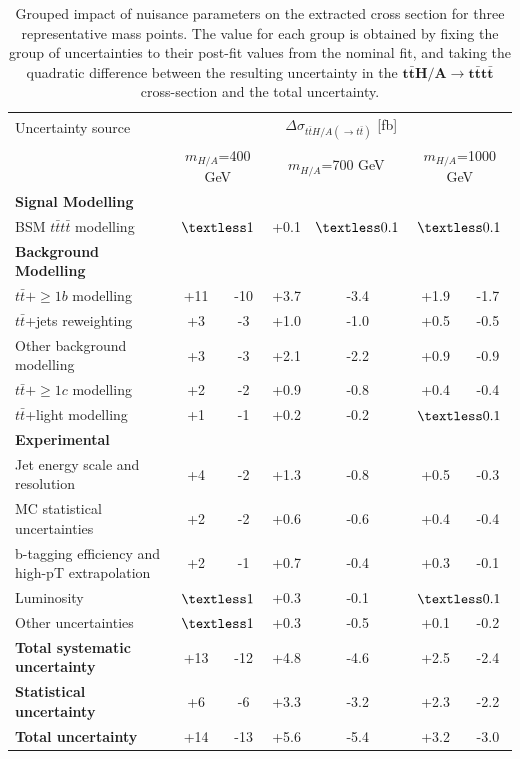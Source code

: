 \begin{table}[htbp!]
    \begin{center}
    \begin{tabular}{lcc|cc|cc}
    \hline \hline
    Uncertainty source & \multicolumn{6}{c}{$\Delta\sigma_{t\bar{t}H/A(\rightarrow t\bar{t})}$ [fb]} \\
    & \multicolumn{2}{c}{$m_{H/A}$=400 GeV} & \multicolumn{2}{c}{$m_{H/A}$=700 GeV} & \multicolumn{2}{c}{$m_{H/A}$=1000 GeV} \\
    \hline
    \textbf{Signal Modelling} & & & & & & \\
    BSM $t\bar{t}t\bar{t}$ modelling & \multicolumn{2}{c}{$\textless 1$} & +0.1 & $\textless 0.1$ & \multicolumn{2}{c}{$\textless 0.1$} \\
    \hline
    \textbf{Background Modelling} & & & & & & \\
    $t\bar{t}+\geq1b$ modelling & +11 & -10 & +3.7 & -3.4 & +1.9 & -1.7 \\
    $t\bar{t}$+jets reweighting & +3 & -3 & +1.0 & -1.0 & +0.5 & -0.5 \\
    Other background modelling & +3 & -3 & +2.1 & -2.2 & +0.9 & -0.9 \\
    $t\bar{t}+\geq1c$ modelling & +2 & -2 & +0.9 & -0.8 & +0.4 & -0.4 \\
    $t\bar{t}$+light modelling & +1 & -1 & +0.2 & -0.2 & \multicolumn{2}{c}{$\textless 0.1$} \\
    \hline
    \textbf{Experimental} & & & & & & \\
    Jet energy scale and resolution & +4 & -2 & +1.3 & -0.8 & +0.5 & -0.3 \\
    MC statistical uncertainties & +2 & -2 & +0.6 & -0.6 & +0.4 & -0.4 \\
    b-tagging efficiency and high-pT extrapolation & +2 & -1 & +0.7 & -0.4 & +0.3 & -0.1 \\
    Luminosity & \multicolumn{2}{c}{$\textless 1$} & +0.3 & -0.1 & \multicolumn{2}{c}{$\textless 0.1$} \\
    Other uncertainties & \multicolumn{2}{c}{$\textless 1$} & +0.3 & -0.5 & +0.1 & -0.2 \\
    \hline \hline
    \textbf{Total systematic uncertainty} & +13 & -12 & +4.8 & -4.6 & +2.5 & -2.4 \\
    \hline \hline
    \textbf{Statistical uncertainty} & +6 & -6 & +3.3 & -3.2 & +2.3 & -2.2 \\
    \hline \hline
    \textbf{Total uncertainty} & +14 & -13 & +5.6 & -5.4 & +3.2 & -3.0 \\
    \hline \hline
    \end{tabular}
    \caption{\label{tab:grouped_impact_400GeV}
    Grouped impact of nuisance parameters on the extracted cross section for three representative mass points.
    The value for each group is obtained by fixing the group of uncertainties to their post-fit values from the
    nominal fit, and taking the quadratic difference between the resulting
    uncertainty in the $\boldsymbol{t\bar{t}H/A \to t\bar{t}t\bar{t}}$ cross-section and the total uncertainty.}
    \end{center}
\end{table}

